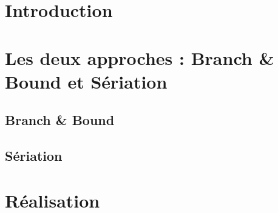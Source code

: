 \documentclass[12pt]{article}
\begin{document}
\section*{Introduction}

\section{Les deux approches : Branch \& Bound et S\'{e}riation}


\subsection{Branch \& Bound}

\subsection{S\'{e}riation}

\section{R\'{e}alisation}
\end{document}
